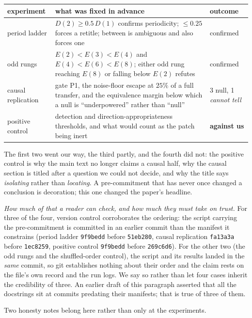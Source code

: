 \documentclass[11pt]{article}
\begin{document}
\begin{center}
\begin{tabular}{@{}lp{3.4cm}p{2.6cm}@{}}
\toprule
experiment & what was fixed in advance & outcome \\
\midrule
period ladder &
  $D(2)\ge 0.5\,D(1)$ confirms periodicity; $\le 0.25$ forces a retitle;
  between is ambiguous and also forces one &
  confirmed \\
odd rungs &
  $E(2)<E(3)<E(4)$ and $E(4)<E(6)<E(8)$; either odd rung reaching $E(8)$ or
  falling below $E(2)$ refutes &
  confirmed \\
causal replication &
  gate P1, the noise-floor escape at $25\%$ of a full transfer, and the
  equivalence margin below which a null is ``underpowered'' rather than
  ``null'' &
  3 null, 1 \emph{cannot tell} \\
positive control &
  detection and direction-appropriateness thresholds, and what would count
  as the patch being inert &
  \textbf{against us} \\
\bottomrule
\end{tabular}
\end{center}

\noindent The first two went our way, the third partly, and the fourth did not:
the positive control is why the main text no longer claims a causal half, why
the causal section is titled after a question we could not decide, and why the
title says \emph{isolating} rather than \emph{locating}. A pre-commitment that
has never once changed a conclusion is decoration; this one changed the paper's
headline.

\emph{How much of that a reader can check, and how much they must take on
trust.} For three of the four, version control corroborates the ordering: the
script carrying the pre-commitment is committed in an earlier commit than the
manifest it constrains (period ladder \texttt{9f9bedd} before
\texttt{51eb280}, causal replication \texttt{fa13a3a} before \texttt{1ec8259},
positive control \texttt{9f9bedd} before \texttt{269c6d6}). For the other two
(the odd rungs and the shuffled-order control), the script and its results
landed in the \emph{same} commit, so git establishes nothing about their order
and the claim rests on the file's own record and the run logs. We say so rather
than let four cases inherit the credibility of three. An earlier draft of this
paragraph asserted that all the docstrings sit at commits predating their
manifests; that is true of three of them.

Two honesty notes belong here rather than only at the experiments.
\end{document}
